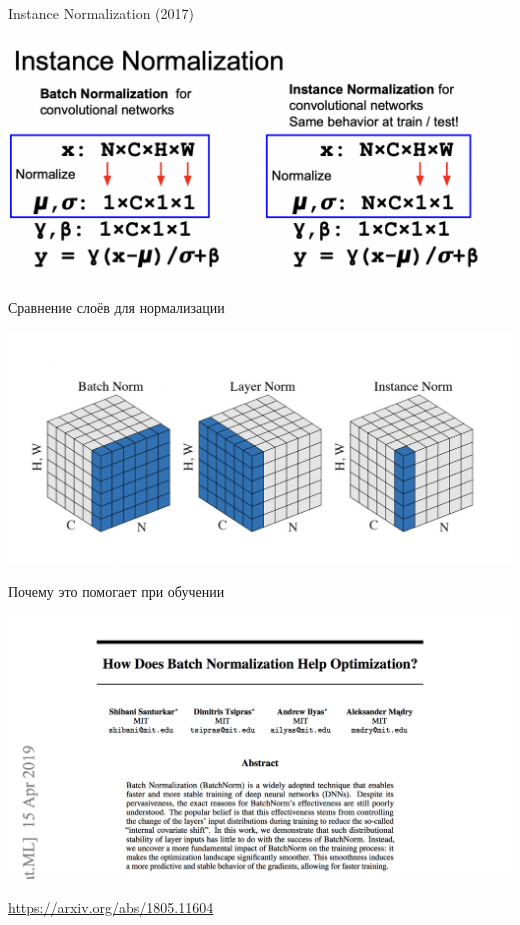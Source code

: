 \documentclass[notes,12pt, aspectratio=169]{beamer}
\begin{document}
\begin{frame}{Instance Normalization (2017)}
	\begin{center}
		\includegraphics[width=.95\linewidth]{st_norm_3.png}
	\end{center}
\end{frame}


\begin{frame}{Сравнение слоёв для нормализации}
	\begin{center}
		\includegraphics[width=.95\linewidth]{st_norm_4.png}
	\end{center}
\end{frame}



\begin{frame}{Почему это помогает при обучении}
	\begin{center}
		\includegraphics[width=.8\linewidth]{how_bn_help.png}
	\end{center}
	\vfill
	\footnotesize
	{\color{blue} \url{https://arxiv.org/abs/1805.11604}}
\end{frame}
\end{document}
